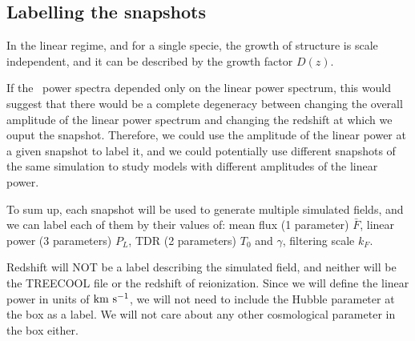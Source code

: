 \subsection{Labelling the snapshots}

In the linear regime, and for a single specie, the growth of structure is 
scale independent, and it can be described by the growth factor $D(z)$.

If the \lya\ power spectra depended only on the linear power spectrum, this 
would suggest that there would be a complete degeneracy between changing 
the overall amplitude of the linear power spectrum and changing the redshift
at which we ouput the snapshot. 
Therefore, we could use the amplitude of the linear power at a given snapshot
to label it, and we could potentially use different snapshots of the same 
simulation to study models with different amplitudes of the linear power. 

 


To sum up, each snapshot will be used to generate multiple simulated 
fields, and we can label each of them by their values of: 
mean flux (1 parameter) $\bar F$,
linear power (3 parameters) $P_L$,
TDR (2 parameters) $T_0$ and $\gamma$, 
filtering scale $k_F$. 

Redshift will NOT be a label describing the simulated field, and neither
will be the TREECOOL file or the redshift of reionization.
Since we will define the linear power in units of ${\rm km~s^{-1}}$, we will not 
need to include the Hubble parameter at the box as a label.
We will not care about any other cosmological parameter in the box
either.
